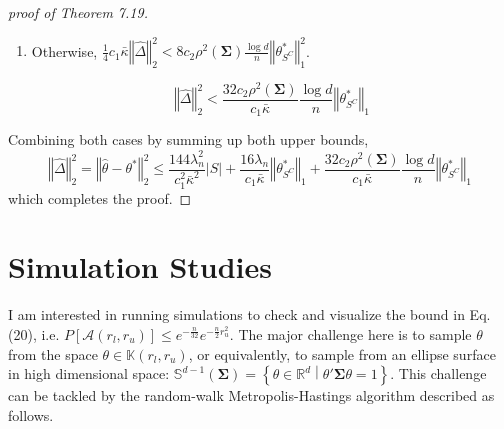 \documentclass[a4paper, 11pt]{article}
\begin{document}
\begin{proof}[proof of Theorem 7.19]
\begin{enumerate}
\item Otherwise, $\frac{1}{4}c_1\bar{\kappa}\left\Vert\hat{\Delta} \right\Vert_2^2 < 8c_2\rho^2(\mathbf{\Sigma})\frac{\log d}{n}\left\Vert \theta^*_{S^C} \right\Vert_1^2$.

\begin{equation}
\left\Vert\hat{\Delta} \right\Vert_2^2 < \frac{32c_2\rho^2(\mathbf{\Sigma})}{c_1\bar{\kappa}}\frac{\log d}{n}\left\Vert\theta^*_{S^C} \right\Vert_1
\end{equation}
\end{enumerate}


Combining both cases by summing up both upper bounds, 
\begin{equation}
\left\Vert\hat{\Delta} \right\Vert_2^2 = \left\Vert\hat{\theta} - \theta^* \right\Vert_2^2 \leq \frac{144\lambda_n^2}{c_1^2\bar{\kappa}^2}|S| + \frac{16\lambda_n}{c_1\bar{\kappa}}\left\Vert\theta^*_{S^C} \right\Vert_1 + \frac{32c_2\rho^2(\mathbf{\Sigma})}{c_1\bar{\kappa}}\frac{\log d}{n}\left\Vert\theta^*_{S^C} \right\Vert_1
\end{equation}
which completes the proof. 

\end{proof}

























\section*{Simulation Studies}

I am interested in running simulations to check and visualize the bound in Eq. (20), i.e. $P\left[\mathcal{A}(r_l, r_u)\right] \leq e^{-\frac{n}{32}}e^{-\frac{n}{2}r_u^2}$. The major challenge here is to sample $\theta$ from the space $\theta\in\mathbb{K}(r_l, r_u)$, or equivalently, to sample from an ellipse surface in high dimensional space: $\mathbb{S}^{d-1}(\mathbf{\Sigma})=\left\{ \theta\in\mathbb{R}^d\middle| \theta'\mathbf{\Sigma}\theta=1\right\}$. This challenge can be tackled by the random-walk Metropolis-Hastings algorithm described as follows. 
\end{document}
